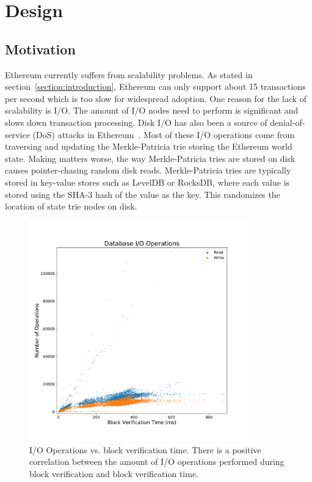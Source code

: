 \documentclass[12pt]{article}
\newcommand{\figurewidth}{0.85\textwidth}
\begin{document}

\section{Design}

\subsection{Motivation}


Ethereum currently suffers from scalability problems. As stated in section~\ref{section:introduction}, Ethereum can only support about 15 transactions per second which is too slow for widespread adoption. One reason for the lack of scalability is I/O. The amount of I/O nodes need to perform is significant and slows down transaction processing. Disk I/O has also been a source of denial-of-service (DoS) attacks in Ethereum~\cite{statelessclients}. Most of these I/O operations come from traversing and updating the Merkle-Patricia trie storing the Ethereum world state. Making matters worse, the way Merkle-Patricia tries are stored on disk causes pointer-chasing random disk reads. Merkle-Patricia tries are typically stored in key-value stores such as LevelDB or RocksDB, where each value is stored using the SHA-3 hash of the value as the key. This randomizes the location of state trie nodes on disk.

\begin{figure}[H]
  \centering
  \includegraphics[width=\figurewidth]{../figures/results/graphs/background/db-io-ops-elapsed.pdf}
  \caption{I/O Operations vs. block verification time. There is a positive correlation between the amount of I/O operations performed during block verification and block verification time.}
  \label{fig:blockverificationtime}
\end{figure}
\end{document}
